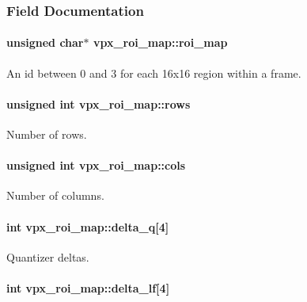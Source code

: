 \subsubsection{\-Field \-Documentation}
\hypertarget{structvpx__roi__map_aba69e211b81d622977ba07ac47b61075}{
\paragraph[{roi\-\_\-map}]{\setlength{\rightskip}{0pt plus 5cm}unsigned char$\ast$ {\bf vpx\-\_\-roi\-\_\-map\-::roi\-\_\-map}}}\label{structvpx__roi__map_aba69e211b81d622977ba07ac47b61075}
\-An id between 0 and 3 for each 16x16 region within a frame. \hypertarget{structvpx__roi__map_a3fdcecd472553d08a99ced02cda5c9a6}{
\paragraph[{rows}]{\setlength{\rightskip}{0pt plus 5cm}unsigned int {\bf vpx\-\_\-roi\-\_\-map\-::rows}}}\label{structvpx__roi__map_a3fdcecd472553d08a99ced02cda5c9a6}
\-Number of rows. \hypertarget{structvpx__roi__map_a5458459aaf16b14b86fb0adef32757c8}{
\paragraph[{cols}]{\setlength{\rightskip}{0pt plus 5cm}unsigned int {\bf vpx\-\_\-roi\-\_\-map\-::cols}}}\label{structvpx__roi__map_a5458459aaf16b14b86fb0adef32757c8}
\-Number of columns. \hypertarget{structvpx__roi__map_a6e7aecf1d31c329f43dcb36717b3999b}{
\paragraph[{delta\-\_\-q}]{\setlength{\rightskip}{0pt plus 5cm}int {\bf vpx\-\_\-roi\-\_\-map\-::delta\-\_\-q}\mbox{[}4\mbox{]}}}\label{structvpx__roi__map_a6e7aecf1d31c329f43dcb36717b3999b}
\-Quantizer deltas. \hypertarget{structvpx__roi__map_a5164be48a612bf872b81e0a86726fbed}{
\paragraph[{delta\-\_\-lf}]{\setlength{\rightskip}{0pt plus 5cm}int {\bf vpx\-\_\-roi\-\_\-map\-::delta\-\_\-lf}\mbox{[}4\mbox{]}}}\label{structvpx__roi__map_a5164be48a612bf872b81e0a86726fbed}
